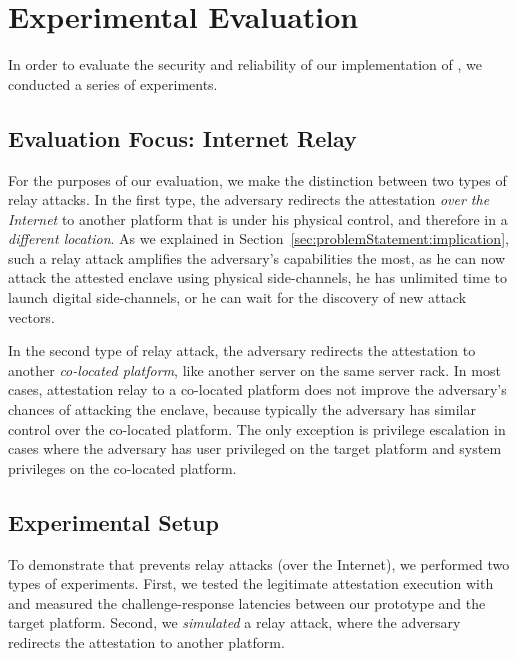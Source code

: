 \section{Experimental Evaluation}
\label{sec:evaluation}

In order to evaluate the security and reliability of our implementation of \name, we conducted a series of experiments.

\subsection{Evaluation Focus: Internet Relay}
\label{sec:evaluation:focus}

For the purposes of our evaluation, we make the distinction between two types of relay attacks. In the first type, the adversary redirects the attestation \emph{over the Internet} to another platform that is under his physical control, and therefore in a \emph{different location}. As we explained in Section~\ref{sec:problemStatement:implication}, such a relay attack amplifies the adversary's capabilities the most, as he can now attack the attested enclave using physical side-channels, he has unlimited time to launch digital side-channels, or he can wait for the discovery of new attack vectors. 
 
In the second type of relay attack, the adversary redirects the attestation to another \emph{co-located platform}, like another server on the same server rack. In most cases, attestation relay to a co-located platform does not improve the adversary's chances of attacking the enclave, because typically the adversary has similar control over the co-located platform. The only exception is privilege escalation in cases where the adversary has user privileged on the target platform and system privileges on the co-located platform. 



\subsection{Experimental Setup}
\label{sec:evaluation:exp}

To demonstrate that \name prevents relay attacks (over the Internet), we performed two types of experiments. First, we tested the legitimate attestation execution with \name and measured the challenge-response latencies between our prototype and the target platform. Second, we \emph{simulated} a relay attack, where the adversary redirects the attestation to another platform.

